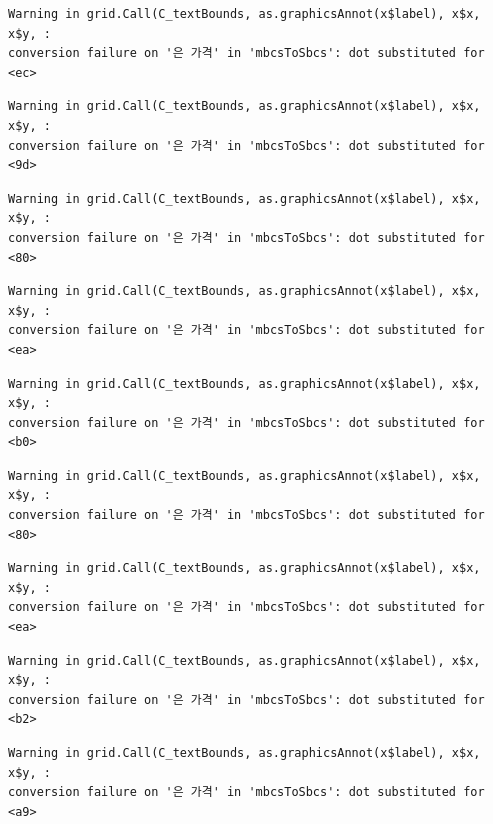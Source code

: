 \documentclass[
  letterpaper,
  DIV=11,
  numbers=noendperiod]{scrreprt}
\begin{document}
\begin{verbatim}
Warning in grid.Call(C_textBounds, as.graphicsAnnot(x$label), x$x, x$y, :
conversion failure on '은 가격' in 'mbcsToSbcs': dot substituted for <ec>
\end{verbatim}

\begin{verbatim}
Warning in grid.Call(C_textBounds, as.graphicsAnnot(x$label), x$x, x$y, :
conversion failure on '은 가격' in 'mbcsToSbcs': dot substituted for <9d>
\end{verbatim}

\begin{verbatim}
Warning in grid.Call(C_textBounds, as.graphicsAnnot(x$label), x$x, x$y, :
conversion failure on '은 가격' in 'mbcsToSbcs': dot substituted for <80>
\end{verbatim}

\begin{verbatim}
Warning in grid.Call(C_textBounds, as.graphicsAnnot(x$label), x$x, x$y, :
conversion failure on '은 가격' in 'mbcsToSbcs': dot substituted for <ea>
\end{verbatim}

\begin{verbatim}
Warning in grid.Call(C_textBounds, as.graphicsAnnot(x$label), x$x, x$y, :
conversion failure on '은 가격' in 'mbcsToSbcs': dot substituted for <b0>
\end{verbatim}

\begin{verbatim}
Warning in grid.Call(C_textBounds, as.graphicsAnnot(x$label), x$x, x$y, :
conversion failure on '은 가격' in 'mbcsToSbcs': dot substituted for <80>
\end{verbatim}

\begin{verbatim}
Warning in grid.Call(C_textBounds, as.graphicsAnnot(x$label), x$x, x$y, :
conversion failure on '은 가격' in 'mbcsToSbcs': dot substituted for <ea>
\end{verbatim}

\begin{verbatim}
Warning in grid.Call(C_textBounds, as.graphicsAnnot(x$label), x$x, x$y, :
conversion failure on '은 가격' in 'mbcsToSbcs': dot substituted for <b2>
\end{verbatim}

\begin{verbatim}
Warning in grid.Call(C_textBounds, as.graphicsAnnot(x$label), x$x, x$y, :
conversion failure on '은 가격' in 'mbcsToSbcs': dot substituted for <a9>
\end{verbatim}
\end{document}
